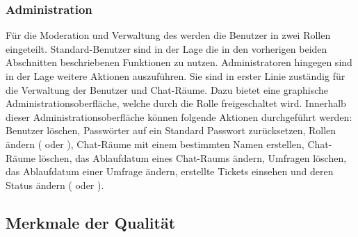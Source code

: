 \subsubsection{Administration}
Für die Moderation und Verwaltung des  werden die Benutzer in zwei Rollen eingeteilt.
Standard-Benutzer sind in der Lage die in den vorherigen beiden Abschnitten beschriebenen Funktionen zu nutzen.
Administratoren hingegen sind in der Lage weitere Aktionen auszuführen.
Sie sind in erster Linie zuständig für die Verwaltung der Benutzer und Chat-Räume.
Dazu bietet  eine graphische Administrationsoberfläche, welche durch die Rolle  freigeschaltet wird.
\newparagraph
Innerhalb dieser Administrationsoberfläche können folgende Aktionen durchgeführt werden:
Benutzer löschen, Passwörter auf ein Standard Passwort zurücksetzen, Rollen ändern ( oder ), Chat-Räume mit einem bestimmten Namen erstellen, Chat-Räume löschen, das Ablaufdatum eines Chat-Raums ändern, Umfragen löschen, das Ablaufdatum einer Umfrage ändern, erstellte Tickets einsehen und deren Status ändern ( oder ).

\subsection{Merkmale der Qualität}\label{sec:ProduktUndGebrauchsqualitaet}
